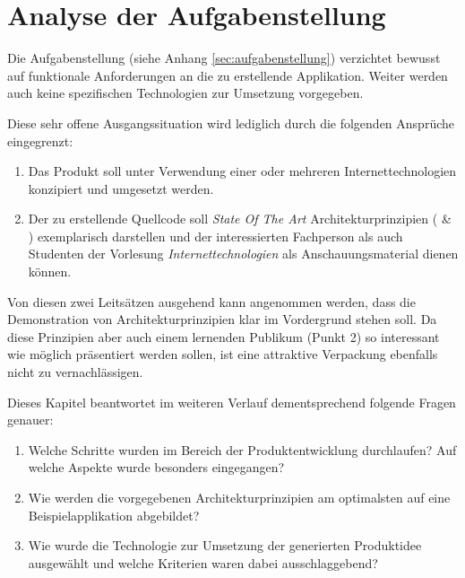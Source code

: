 \chapter{Analyse der Aufgabenstellung}

Die Aufgabenstellung (siehe Anhang \ref{sec:aufgabenstellung}) verzichtet bewusst auf funktionale Anforderungen an die zu erstellende Applikation. Weiter werden auch keine spezifischen Technologien zur Umsetzung vorgegeben.

Diese sehr offene Ausgangssituation wird lediglich durch die folgenden Ansprüche eingegrenzt:

\begin{enumerate}
	\item Das Produkt soll unter Verwendung einer oder mehreren Internettechnologien konzipiert und umgesetzt werden.
	\item Der zu erstellende Quellcode soll \emph{State Of The Art} Architekturprinzipien (\cite{ROCA} \& \cite{TilkovSlides}) exemplarisch darstellen und der interessierten Fachperson als auch Studenten der Vorlesung \emph{Internettechnologien} als Anschauungsmaterial dienen können.
\end{enumerate}

Von diesen zwei Leitsätzen ausgehend kann angenommen werden, dass die Demonstration von Architekturprinzipien klar im Vordergrund stehen soll. Da diese Prinzipien aber auch einem lernenden Publikum (Punkt 2) so interessant wie möglich präsentiert werden sollen, ist eine attraktive Verpackung ebenfalls nicht zu vernachlässigen.

Dieses Kapitel beantwortet im weiteren Verlauf dementsprechend folgende Fragen genauer:

\begin{enumerate}
	\item Welche Schritte wurden im Bereich der Produktentwicklung durchlaufen? Auf welche Aspekte wurde besonders eingegangen?
	\item Wie werden die vorgegebenen Architekturprinzipien am optimalsten auf eine Beispielapplikation abgebildet?
	\item Wie wurde die Technologie zur Umsetzung der generierten Produktidee ausgewählt und welche Kriterien waren dabei ausschlaggebend?
\end{enumerate}

\newpage


\newpage


\newpage



